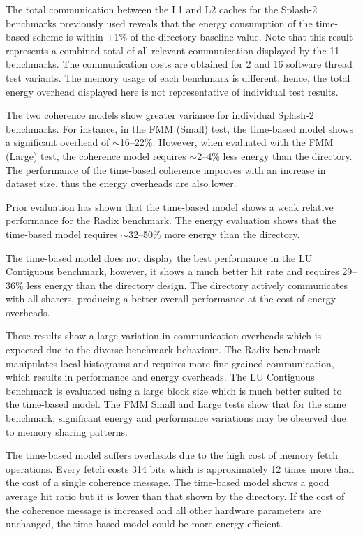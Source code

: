			The total communication between the L1 and L2 caches for the Splash-2 benchmarks previously used reveals that the energy consumption of the time-based scheme is within $\pm$1\% of the directory baseline value. Note that this result represents a combined total of all relevant communication displayed by the 11 benchmarks. The communication costs are obtained for 2 and 16 software thread test variants.
			The memory usage of each benchmark is different, hence, the total energy overhead displayed here is not representative of individual test results.
			
			The two coherence models show greater variance for individual Splash-2 benchmarks. For instance, in the FMM (Small) test, the time-based model shows a significant overhead of $\sim$16--22\%. However, when evaluated with the FMM (Large) test, the coherence model requires $\sim$2--4\% less energy than the directory. The performance of the time-based coherence improves with an increase in dataset size, thus the energy overheads are also lower.
			
			Prior evaluation has shown that the time-based model shows a weak relative performance for the Radix benchmark. The energy evaluation shows that the time-based model requires $\sim$32--50\% more energy than the directory.
			
			The time-based model does not display the best performance in the LU Contiguous benchmark, however, it shows a much better hit rate and requires 29--36\% less energy than the directory design. The directory actively communicates with all sharers, producing a better overall performance at the cost of energy overheads.
			
			These results show a large variation in communication overheads which is expected due to the diverse benchmark behaviour. The Radix benchmark manipulates local histograms and requires more fine-grained communication, which results in performance and energy overheads. The LU Contiguous benchmark is evaluated using a large block size which is much better suited to the time-based model. The FMM Small and Large tests show that for the same benchmark, significant energy and performance variations may be observed due to memory sharing patterns.
			
			The time-based model suffers overheads due to the high cost of memory fetch operations. Every fetch costs 314 bits which is approximately 12 times more than the cost of a single coherence message. The time-based model shows a good average hit ratio but it is lower than that shown by the directory. If the cost of the coherence message is increased and all other hardware parameters are unchanged, the time-based model could be more energy efficient.
			

